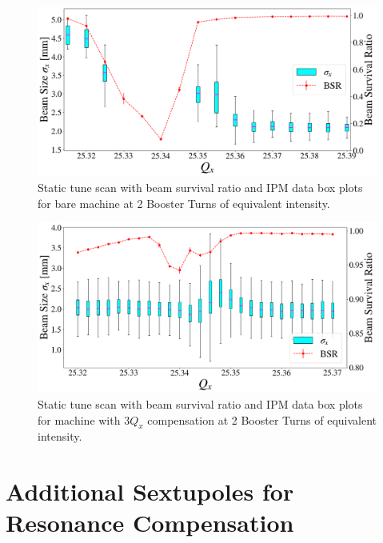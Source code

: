 
\begin{figure}[H]
    \centering
    \includegraphics[width=\columnwidth]{chapter4/static2turns_ipm.png}
    \caption{Static tune scan with beam survival ratio and IPM data box plots for bare machine at 2 Booster Turns of equivalent intensity.}
    \label{fig:static2_ipm}
\end{figure}

\begin{figure}[H]
    \centering
    \includegraphics[width=\columnwidth]{chapter4/static2turns_comp_ipm_dampersOFF.png}
    \caption{Static tune scan with beam survival ratio and IPM data box plots for machine with $3Q_x$ compensation at 2 Booster Turns of equivalent intensity.}
    \label{fig:static2_ipm_comp}
\end{figure}

\section{Additional Sextupoles for Resonance Compensation}
\label{sec:addsexts}

